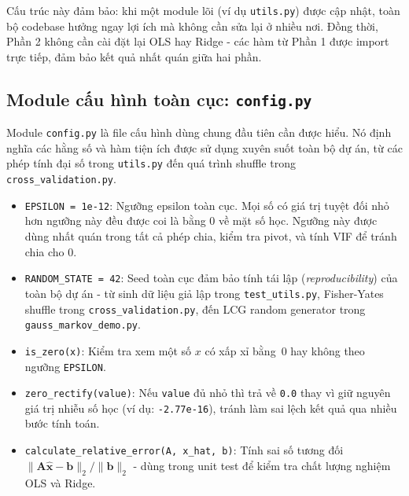 Cấu trúc này đảm bảo: khi một module lõi (ví dụ \texttt{utils.py}) được cập nhật, toàn bộ codebase hưởng ngay lợi ích mà không cần sửa lại ở nhiều nơi. Đồng thời, Phần 2 không cần cài đặt lại OLS hay Ridge - các hàm từ Phần 1 được import trực tiếp, đảm bảo kết quả nhất quán giữa hai phần.


\subsection{Module cấu hình toàn cục: \texttt{config.py}}

Module \texttt{config.py} là file cấu hình dùng chung đầu tiên cần được hiểu. Nó định nghĩa các hằng số và hàm tiện ích được sử dụng xuyên suốt toàn bộ dự án, từ các phép tính đại số trong \texttt{utils.py} đến quá trình shuffle trong \texttt{cross\_validation.py}.

\begin{itemize}
    \item \texttt{EPSILON = 1e-12}: Ngưỡng epsilon toàn cục. Mọi số có giá trị tuyệt đối nhỏ hơn ngưỡng này đều được coi là bằng 0 về mặt số học. Ngưỡng này được dùng nhất quán trong tất cả phép chia, kiểm tra pivot, và tính VIF để tránh chia cho 0.
    \item \texttt{RANDOM\_STATE = 42}: Seed toàn cục đảm bảo tính tái lập (\emph{reproducibility}) của toàn bộ dự án - từ sinh dữ liệu giả lập trong \texttt{test\_utils.py}, Fisher-Yates shuffle trong \texttt{cross\_validation.py}, đến LCG random generator trong \texttt{gauss\_markov\_demo.py}.
    \item \texttt{is\_zero(x)}: Kiểm tra xem một số $x$ có xấp xỉ bằng~0 hay không theo ngưỡng \texttt{EPSILON}.
    \item \texttt{zero\_rectify(value)}: Nếu \texttt{value} đủ nhỏ thì trả về \texttt{0.0} thay vì giữ nguyên giá trị nhiễu số học (ví dụ: \texttt{-2.77e-16}), tránh làm sai lệch kết quả qua nhiều bước tính toán.
    \item \texttt{calculate\_relative\_error(A, x\_hat, b)}: Tính sai số tương đối $\|\mathbf{A}\hat{\mathbf{x}} - \mathbf{b}\|_2 / \|\mathbf{b}\|_2$ - dùng trong unit test để kiểm tra chất lượng nghiệm OLS và Ridge.
\end{itemize}

